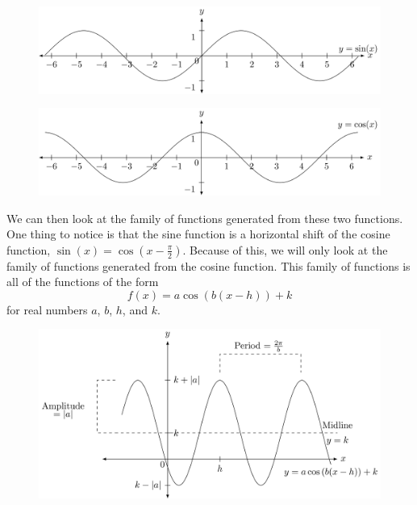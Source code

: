 \documentclass[
]{book}
\theoremstyle{definition}
\theoremstyle{definition}
\theoremstyle{definition}
\theoremstyle{remark}
\begin{document}
\begin{figure}

{\centering \includegraphics[width=1\linewidth]{tikz/sine-graph} 

}

\end{figure}

\begin{figure}

{\centering \includegraphics[width=1\linewidth]{tikz/cosine-graph} 

}

\end{figure}

We can then look at the family of functions generated from these two functions. One thing to notice is that the sine function is a horizontal shift of the cosine function, \(\sin(x)=\cos\left(x-\frac{\pi}{2}\right)\). Because of this, we will only look at the family of functions generated from the cosine function. This family of functions is all of the functions of the form
\[f(x)=a \cos\left(b(x-h)\right) +k\]
for real numbers \(a\), \(b\), \(h\), and \(k\).

\begin{figure}

{\centering \includegraphics[width=1\linewidth]{tikz/cosine-graph2} 

}

\end{figure}
\end{document}
